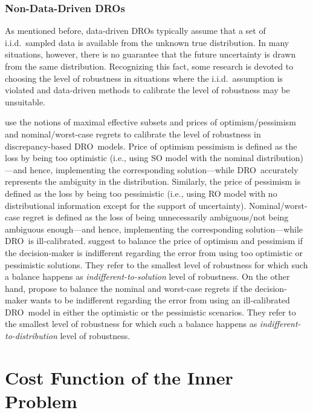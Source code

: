 \documentclass[final,onefignum,onetabnum]{class}
\newcommand{\dro}{DRO}
\begin{document}
\subsubsection{Non-Data-Driven \dro s}	

As mentioned before, data-driven \dro s \linebreak typically assume that a set of i.i.d.\ sampled data is available from the unknown true distribution. 
In many situations, however, there is no guarantee that the future uncertainty is drawn from the same distribution.  
Recognizing this fact, some research is devoted to choosing the level of robustness in situations where the i.i.d.\ assumption is violated and data-driven methods to calibrate the level of robustness may be unsuitable.  

\citet{rahimian2019NV} use the notions of maximal effective  subsets and prices of optimism/pessimism and nominal/worst-case regrets to calibrate the level of robustness in discrepancy-based \dro\ models. Price of optimism pessimism is defined as the loss by being too optimistic (i.e., using SO model with the nominal distribution)---and hence, implementing the corresponding solution---while \dro\ accurately represents the ambiguity in the  distribution. Similarly, the price of pessimism is defined  as the loss by being too pessimistic (i.e., using RO model with no distributional information except for the support of uncertainty). 
Nominal/worst-case regret is defined as the loss of being unnecessarily ambiguous/not being ambiguous enough---and hence, implementing the corresponding solution---while \dro\ is ill-calibrated.
\citet{rahimian2019NV} suggest to balance the price of optimism and pessimism if the decision-maker is indifferent regarding the error from using too optimistic or pessimistic solutions. They refer to the smallest level of robustness for which such a balance happens as {\it indifferent-to-solution} level of robustness. On the other hand, \citet{rahimian2019NV} propose to balance the nominal and worst-case regrets if the decision-maker wants to be indifferent regarding the error from using an ill-calibrated \dro\ model in either the optimistic or the pessimistic scenarios. They refer to the smallest level of robustness for which such a balance happens as {\it indifferent-to-distribution} level of robustness. 
 


\section{Cost Function of the Inner Problem}
\label{sec: rev.cost_inner}
\end{document}

